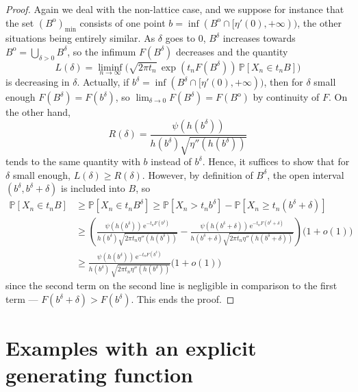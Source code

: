 \documentclass[12pt,a4paper,reqno]{amsart}
\theoremstyle{remark}
\newcommand{\E}{\mathrm{e}}
\newcommand{\proba}{\mathbb{P}}
\begin{document}
\begin{proof}
Again we deal with the non-lattice case, and we suppose for instance that the set $(B^{\mathrm{o}})_{\min}$ consists of one point $b = \inf (B^{\mathrm{o}} \cap [\eta'(0),+\infty))$, the other situations being entirely similar. As $\delta$ goes to $0$, $B^{\delta}$ increases towards $B^{\mathrm{o}}=\bigcup_{\delta >0}B^{\delta}$, so the infimum $F(B^{\delta})$ decreases and the quantity $$L(\delta)=\liminf_{n \to \infty} \big(\sqrt{2\pi t_{n}}\,\exp(t_{n}F(B^{\delta}))\,\proba[X_{n} \in t_{n} B]\big)$$ is decreasing in $\delta$. 
Actually, if $b^{\delta} = \inf (B^{\delta} \cap [\eta'(0),+\infty))$, then for $\delta$ small enough $F(B^{\delta})=F(b^{\delta})$, so $\lim_{\delta \to 0}F(B^{\delta})=F(B^{\mathrm{o}})$ by continuity of $F$. On the other hand,  
$$R(\delta) = \frac{\psi(h(b^{\delta}))}{h(b^{\delta})\sqrt{\eta''(h(b^{\delta}))}}$$
tends to the same quantity with $b$ instead of $b^{\delta}$. Hence, it suffices to show that for $\delta$ small enough, $L(\delta)\geq R(\delta)$. However, by definition of $B^{\delta}$, the open interval $(b^{\delta},b^{\delta}+\delta)$ is included into $B$, so 
\begin{align*}\proba[X_{n} \in t_{n}B]&\geq \proba[X_{n} \in t_{n}B^{\delta}] \geq \proba[X_{n} > t_{n}b^{\delta}] - \proba[X_{n} \geq t_{n}(b^{\delta}+\delta)]\\
&\geq \left(\frac{\psi(h(b^{\delta}))\,\E^{-t_{n}F(b^{\delta})}}{h(b^{\delta})\sqrt{2\pi t_{n}\eta''(h(b^{\delta}))}}- \frac{\psi(h(b^{\delta}+\delta))\,\E^{-t_{n}F(b^{\delta}+\delta)}}{h(b^{\delta}+\delta)\sqrt{2\pi t_{n}\eta''(h(b^{\delta}+\delta))}}\right)\big(1+o(1)\big)\\
&\geq \frac{\psi(h(b^{\delta}))\,\E^{-t_{n}F(b^{\delta})}}{h(b^{\delta})\,\sqrt{2\pi t_{n}\eta''(h(b^{\delta}))}}\big(1+o(1)\big)
\end{align*}
since the second term on the second line is negligible in comparison to the first term --- $F(b^{\delta}+\delta)>F(b^{\delta})$. This ends the proof.
\end{proof}
\bigskip


















\section{Examples with an explicit generating function}\label{sec:firstexamples}
\end{document}
